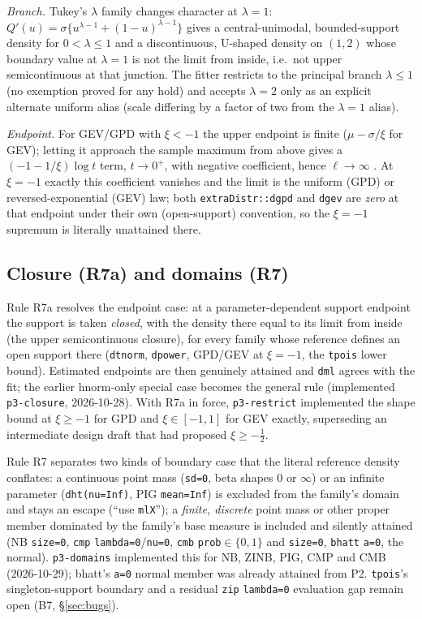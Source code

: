 \documentclass[11pt]{article}
\newcommand{\code}[1]{\texttt{#1}}
\theoremstyle{plain}
\theoremstyle{definition}
\theoremstyle{remark}
\begin{document}
\emph{Branch.} Tukey's $\lambda$ family changes character at $\lambda=1$:
$Q'(u)=\sigma\{u^{\lambda-1}+(1-u)^{\lambda-1}\}$ gives a central-unimodal,
bounded-support density for $0<\lambda\le1$ and a discontinuous, U-shaped
density on $(1,2)$ whose boundary value at $\lambda=1$ is not the limit from
inside, i.e.\ not upper semicontinuous at that junction. The fitter
restricts to the principal branch $\lambda\le1$ (no exemption proved for any
hold) and accepts $\lambda=2$ only as an explicit alternate uniform alias
(scale differing by a factor of two from the $\lambda=1$ alias).

\emph{Endpoint.} For GEV/GPD with $\xi<-1$ the upper endpoint is finite
($\mu-\sigma/\xi$ for GEV); letting it approach the sample maximum from
above gives a $(-1-1/\xi)\log t$ term, $t\to0^+$, with negative coefficient,
hence $\ell\to\infty$ \cite{grimshaw1993}. At $\xi=-1$ exactly this
coefficient vanishes and the limit is the uniform (GPD) or
reversed-exponential (GEV) law; both \code{extraDistr::dgpd} and
\code{dgev} are \emph{zero} at that endpoint under their own (open-support)
convention, so the $\xi=-1$ supremum is literally unattained there.

\subsection*{Closure (R7a) and domains (R7)}

Rule R7a resolves the endpoint case: at a parameter-dependent support
endpoint the support is taken \emph{closed}, with the density there equal to
its limit from inside (the upper semicontinuous closure), for every family
whose reference defines an open support there (\code{dtnorm}, \code{dpower},
GPD/GEV at $\xi=-1$, the \code{tpois} lower bound). Estimated endpoints are
then genuinely attained and \code{dml} agrees with the fit; the earlier
hnorm-only special case becomes the general rule (implemented
\code{p3-closure}, 2026-10-28). With R7a in force, \code{p3-restrict}
implemented the shape bound at $\xi\ge-1$ for GPD and $\xi\in[-1,1]$ for
GEV exactly, superseding an intermediate design draft that had proposed
$\xi\ge-\tfrac12$.

Rule R7 separates two kinds of boundary case that the literal reference
density conflates: a continuous point mass (\code{sd=0}, beta shapes $0$ or
$\infty$) or an infinite parameter (\code{dht(nu=Inf)}, PIG \code{mean=Inf})
is excluded from the family's domain and stays an escape (``use
\code{mlX}''); a \emph{finite, discrete} point mass or other proper member
dominated by the family's base measure is included and silently attained
(NB \code{size=0}, \code{cmp} \code{lambda=0}/\code{nu=0}, \code{cmb}
\code{prob}$\in\{0,1\}$ and \code{size=0}, \code{bhatt} \code{a=0}, the
normal). \code{p3-domains} implemented this for NB, ZINB, PIG, CMP and CMB
(2026-10-29); bhatt's \code{a=0} normal member was already attained from P2.
\code{tpois}'s singleton-support boundary and a residual \code{zip}
\code{lambda=0} evaluation gap remain open (B7, \S\ref{sec:bugs}).
\end{document}
